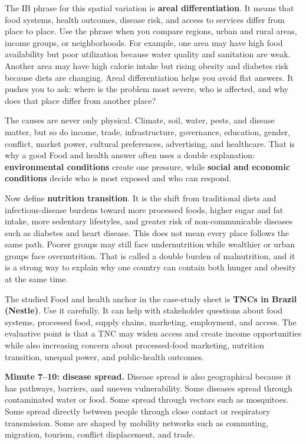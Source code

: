 \documentclass[11pt,a4paper]{article}
\newcommand{\term}[1]{\textcolor{HeadingBlue}{\textbf{#1}}}
\begin{document}
The IB phrase for this spatial variation is \term{areal differentiation}. It
means that food systems, health outcomes, disease risk, and access to services
differ from place to place. Use the phrase when you compare regions, urban and
rural areas, income groups, or neighborhoods. For example, one area may have
high food availability but poor utilization because water quality and sanitation
are weak. Another area may have high calorie intake but rising obesity and
diabetes risk because diets are changing. Areal differentiation helps you avoid
flat answers. It pushes you to ask: where is the problem most severe, who is
affected, and why does that place differ from another place?

The causes are never only physical. Climate, soil, water, pests, and disease
matter, but so do income, trade, infrastructure, governance, education, gender,
conflict, market power, cultural preferences, advertising, and healthcare.
That is why a good Food and health answer often uses a double explanation:
\term{environmental conditions} create one pressure, while \term{social and
economic conditions} decide who is most exposed and who can respond.

Now define \term{nutrition transition}. It is the shift from traditional diets
and infectious-disease burdens toward more processed foods, higher sugar and fat
intake, more sedentary lifestyles, and greater risk of non-communicable diseases
such as diabetes and heart disease. This does not mean every place follows the
same path. Poorer groups may still face undernutrition while wealthier or urban
groups face overnutrition. That is called a double burden of malnutrition, and
it is a strong way to explain why one country can contain both hunger and
obesity at the same time.

The studied Food and health anchor in the case-study sheet is \term{TNCs in
Brazil (Nestle)}. Use it carefully. It can help with stakeholder questions
about food systems, processed food, supply chains, marketing, employment, and
access. The evaluative point is that a TNC may widen access and create income
opportunities while also increasing concern about processed-food marketing,
nutrition transition, unequal power, and public-health outcomes.

\textbf{Minute 7--10: disease spread.}
Disease spread is also geographical because it has pathways, barriers, and
uneven vulnerability. Some diseases spread through contaminated water or food.
Some spread through vectors such as mosquitoes. Some spread directly between
people through close contact or respiratory transmission. Some are shaped by
mobility networks such as commuting, migration, tourism, conflict displacement,
and trade.
\end{document}
